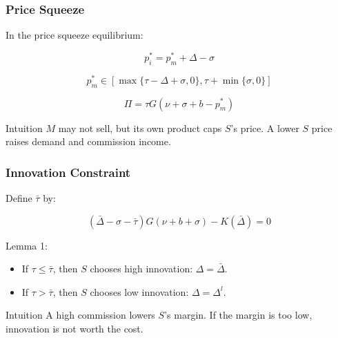 \documentclass[aspectratio=169,AutoFakeBold,AutoFakeSlant]{beamer}
\begin{document}
\begin{frame}
  \frametitle{Price Squeeze}
  \small
  In the price squeeze equilibrium:

  \begin{equation*}
    p_i^*=p_m^*+\Delta-\sigma
  \end{equation*}

  \begin{equation*}
    p_m^*\in
    \left[
    \max\{\tau-\Delta+\sigma,0\},
    \tau+\min\{\sigma,0\}
    \right]
  \end{equation*}

  \begin{equation*}
    \Pi=\tau G(\nu+\sigma+b-p_m^*)
  \end{equation*}

  \begin{block}{Intuition}
    $M$ may not sell, but its own product caps $S$'s price. A lower $S$ price raises demand and commission income.
  \end{block}
\end{frame}

\begin{frame}
  \frametitle{Innovation Constraint}
  \small
  Define $\bar{\tau}$ by:

  \begin{equation*}
    (\bar{\Delta}-\sigma-\bar{\tau})G(\nu+b+\sigma)-K(\bar{\Delta})=0
  \end{equation*}

  Lemma 1:

  \begin{itemize}
    \item If $\tau\leq\bar{\tau}$, then $S$ chooses high innovation: $\Delta=\bar{\Delta}$.
    \item If $\tau>\bar{\tau}$, then $S$ chooses low innovation: $\Delta=\Delta^l$.
  \end{itemize}

  \begin{alertblock}{Intuition}
    A high commission lowers $S$'s margin. If the margin is too low, innovation is not worth the cost.
  \end{alertblock}
\end{frame}
\end{document}
